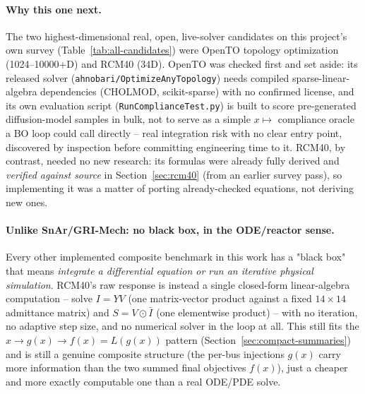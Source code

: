 \documentclass[11pt]{article}
\begin{document}
\paragraph{Why this one next.} The two highest-dimensional real,
open, live-solver candidates on this project's own survey
(Table~\ref{tab:all-candidates}) were OpenTO topology optimization
(1024--10000+D) and RCM40 (34D). OpenTO was checked first and set
aside: its released solver (\texttt{ahnobari/OptimizeAnyTopology})
needs compiled sparse-linear-algebra dependencies (CHOLMOD,
scikit-sparse) with no confirmed license, and its own evaluation script
(\texttt{RunComplianceTest.py}) is built to score pre-generated
diffusion-model samples in bulk, not to serve as a simple $x \mapsto$
compliance oracle a BO loop could call directly -- real integration
risk with no clear entry point, discovered by inspection before
committing engineering time to it. RCM40, by contrast, needed no new
research: its formulas were already fully derived and
\emph{verified against source} in Section~\ref{sec:rcm40} (from an
earlier survey pass), so implementing it was a matter of porting
already-checked equations, not deriving new ones.

\paragraph{Unlike SnAr/GRI-Mech: no black box, in the ODE/reactor
sense.} Every other implemented composite benchmark in this work has a
"black box" that means \emph{integrate a differential equation or run
an iterative physical simulation}. RCM40's raw response is instead a
single closed-form linear-algebra computation -- solve $I = YV$ (one
matrix-vector product against a fixed $14\times14$ admittance matrix)
and $S = V \odot \bar I$ (one elementwise product) -- with no
iteration, no adaptive step size, and no numerical solver in the loop
at all. This still fits the $x \to g(x) \to f(x)=L(g(x))$ pattern
(Section~\ref{sec:compact-summaries}) and is still a genuine composite
structure (the per-bus injections $g(x)$ carry more information than
the two summed final objectives $f(x)$), just a cheaper and more exactly
computable one than a real ODE/PDE solve.
\end{document}
